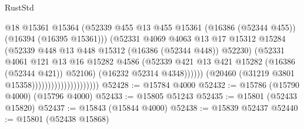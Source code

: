 \begin{lexlean}{RustStd}
\begin{coremodule}
                                                @18
                                                @15361
                                                @15364
                                                (@52339
                                                  @455
                                                  @13
                                                  @455
                                                  @15361
                                                  (@16386 (@52344 @455))
                                                  (@16394 (@16395 @15361)))
                                                (@52331
                                                  @4069
                                                  @4063
                                                  @13
                                                  @17
                                                  @15312
                                                  @15284
                                                  (@52339
                                                    @448
                                                    @13
                                                    @448
                                                    @15312
                                                    (@16386 (@52344 @448))
                                                    @52230)
                                                  (@52331
                                                    @4061
                                                    @121
                                                    @13
                                                    @16
                                                    @15282
                                                    @4586
                                                    (@52339
                                                      @421
                                                      @13
                                                      @421
                                                      @15282
                                                      (@16386 (@52344 @421))
                                                      @52106)
                                                    (@16232 @52314 @4348))))))
                                          (@20460 (@31219 @3801 @15358)))))))))))))))))))))
@52428 := @15784 @4000
@52432 := @15786 (@15790 @4000) (@15796 @4000)
@52433 := @15805 @51243
@52435 := @15801 (@52433 @15820)
@52437 := @15843 (@15844 @4000)
@52438 := @15839 @52437
@52440 := @15801 (@52438 @15868)

\end{coremodule}
\end{lexlean}
